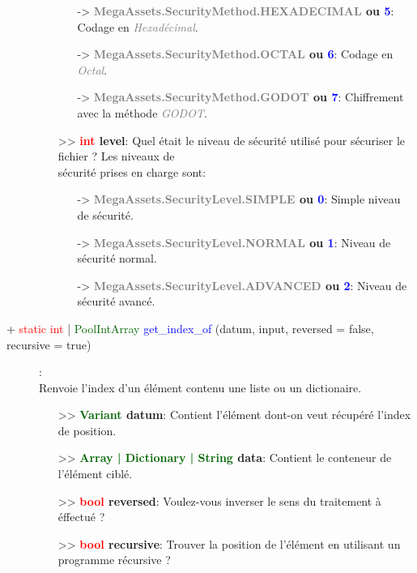 \documentclass[a4paper, 11pt]{article}
\begin{document}
\begin{description}
\begin{itemize}
\begin{itemize}
				\item [-> \textbf{\textcolor{gray}{MegaAssets.SecurityMethod.HEXADECIMAL} ou 
				\textcolor{blue}{5}}:] Codage en \textit{\textcolor{gray}{Hexadécimal}}.
				\item [-> \textbf{\textcolor{gray}{MegaAssets.SecurityMethod.OCTAL} ou \textcolor{blue}
				{6}}:] Codage en \textit{\textcolor{gray}{Octal}}.
				\item [-> \textbf{\textcolor{gray}{MegaAssets.SecurityMethod.GODOT} ou \textcolor{blue}
				{7}}:] Chiffrement avec la méthode \textit{\textcolor{gray}{GODOT}}.
			\end{itemize}
			\item [>> \textbf{\textcolor{red}{int} level}:] Quel était le niveau de sécurité utilisé pour 
			sécuriser le fichier ? Les niveaux de \\sécurité prises en charge sont:
			\begin{itemize}
				\item [-> \textbf{\textcolor{gray}{MegaAssets.SecurityLevel.SIMPLE} ou \textcolor{blue}
				{0}}:] Simple niveau de sécurité.
				\item [-> \textbf{\textcolor{gray}{MegaAssets.SecurityLevel.NORMAL} ou \textcolor{blue}
				{1}}:] Niveau de sécurité normal.
				\item [-> \textbf{\textcolor{gray}{MegaAssets.SecurityLevel.ADVANCED} ou \textcolor{blue}
				{2}}:] Niveau de sécurité avancé.\\
			\end{itemize}
		\end{itemize}
	\end{description}
	\begin{description}
		\item [+ \textcolor{red}{static int} | \textcolor{darkgreen}{PoolIntArray} \textcolor{blue}
		{get\_index\_of} (datum, input, reversed = false, recursive = true)]: \\Renvoie l'index d'un élément 
		contenu une liste ou un dictionaire.
		\begin{itemize}
			\item [>> \textbf{\textcolor{darkgreen}{Variant} datum}:] Contient l'élément dont-on veut
			récupéré l'index de position.
			\item [>> \textbf{\textcolor{darkgreen}{Array | Dictionary | String} data}:] Contient le 
			conteneur de l'élément ciblé.
			\item [>> \textbf{\textcolor{red}{bool} reversed}:] Voulez-vous inverser le sens du traitement à 
			éffectué ?
			\item [>> \textbf{\textcolor{red}{bool} recursive}:] Trouver la position de l'élément en 
			utilisant un programme récursive ?\\
		\end{itemize}
	\end{description}
\end{document}
